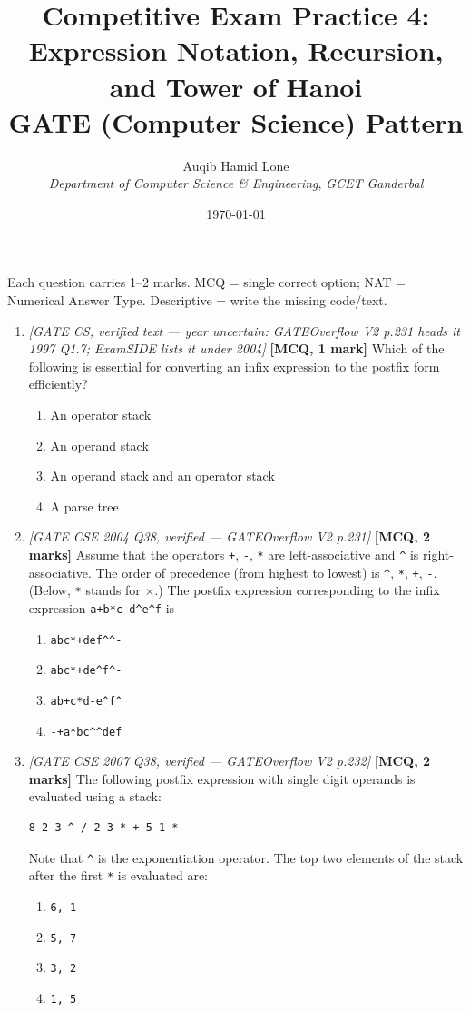 \documentclass[11pt]{article}
\title{Competitive Exam Practice 4: Expression Notation, Recursion, and Tower of Hanoi\\\large GATE (Computer Science) Pattern}
\author{Auqib Hamid Lone\\[0.3em]
  \emph{Department of Computer Science \& Engineering}, \emph{GCET Ganderbal}}
\date{\today}
\begin{document}
\maketitle

\noindent Each question carries 1--2 marks. MCQ = single correct option; NAT = Numerical Answer Type. Descriptive = write the missing code/text.

\begin{enumerate}
\item[\textbf{Q1}] \textit{[GATE CS, verified text --- year uncertain: GATEOverflow V2 p.231 heads it 1997 Q1.7; ExamSIDE lists it under 2004]} \textbf{[MCQ, 1 mark]} Which of the following is essential for converting an infix expression to the postfix form efficiently?
\begin{enumerate}
  \item[(A)] An operator stack
  \item[(B)] An operand stack
  \item[(C)] An operand stack and an operator stack
  \item[(D)] A parse tree
\end{enumerate}

\item[\textbf{Q2}] \textit{[GATE CSE 2004 Q38, verified --- GATEOverflow V2 p.231]} \textbf{[MCQ, 2 marks]} Assume that the operators \texttt{+}, \texttt{-}, \texttt{*} are left-associative and \texttt{\^{}} is right-associative. The order of precedence (from highest to lowest) is \texttt{\^{}}, \texttt{*}, \texttt{+}, \texttt{-}. (Below, \texttt{*} stands for $\times$.) The postfix expression corresponding to the infix expression \texttt{a+b*c-d\^{}e\^{}f} is
\begin{enumerate}
  \item[(A)] \texttt{abc*+def\^{}\^{}-}
  \item[(B)] \texttt{abc*+de\^{}f\^{}-}
  \item[(C)] \texttt{ab+c*d-e\^{}f\^{}}
  \item[(D)] \texttt{-+a*bc\^{}\^{}def}
\end{enumerate}

\item[\textbf{Q3}] \textit{[GATE CSE 2007 Q38, verified --- GATEOverflow V2 p.232]} \textbf{[MCQ, 2 marks]} The following postfix expression with single digit operands is evaluated using a stack:
\begin{verbatim}
8 2 3 ^ / 2 3 * + 5 1 * -
\end{verbatim}
Note that \texttt{\^{}} is the exponentiation operator. The top two elements of the stack after the first \texttt{*} is evaluated are:
\begin{enumerate}
  \item[(A)] \texttt{6, 1}
  \item[(B)] \texttt{5, 7}
  \item[(C)] \texttt{3, 2}
  \item[(D)] \texttt{1, 5}
\end{enumerate}


\end{enumerate}
\end{document}

